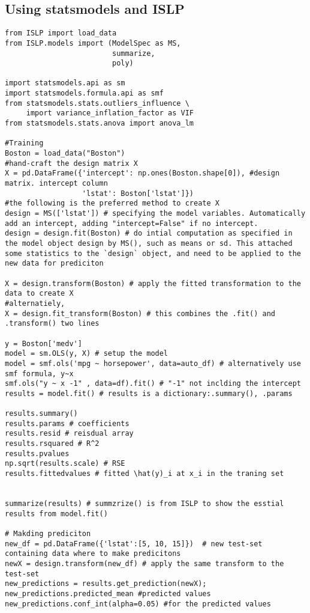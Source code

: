 \documentclass[
  letterpaper,
  DIV=11,
  numbers=noendperiod]{scrreprt}
\begin{document}
\subsection{Using statsmodels and
ISLP}\label{using-statsmodels-and-islp}

\begin{verbatim}
from ISLP import load_data
from ISLP.models import (ModelSpec as MS,
                         summarize,
                         poly)
                         
import statsmodels.api as sm
import statsmodels.formula.api as smf
from statsmodels.stats.outliers_influence \
     import variance_inflation_factor as VIF
from statsmodels.stats.anova import anova_lm

#Training
Boston = load_data("Boston") 
#hand-craft the design matrix X
X = pd.DataFrame({'intercept': np.ones(Boston.shape[0]), #design matrix. intercept column
                  'lstat': Boston['lstat']}) 
#the following is the preferred method to create X
design = MS(['lstat']) # specifying the model variables. Automatically add an intercept, adding "intercept=False" if no intercept. 
design = design.fit(Boston) # do intial computation as specified in the model object design by MS(), such as means or sd. This attached some statistics to the `design` object, and need to be applied to the new data for prediciton

X = design.transform(Boston) # apply the fitted transformation to the data to create X
#alternatiely, 
X = design.fit_transform(Boston) # this combines the .fit() and .transform() two lines

y = Boston['medv']
model = sm.OLS(y, X) # setup the model
model = smf.ols('mpg ~ horsepower', data=auto_df) # alternatively use smf formula, y~x
smf.ols("y ~ x -1" , data=df).fit() # "-1" not inclding the intercept
results = model.fit() # results is a dictionary:.summary(), .params 

results.summary()
results.params # coefficients
results.resid # reisdual array
results.rsquared # R^2
results.pvalues
np.sqrt(results.scale) # RSE
results.fittedvalues # fitted \hat(y)_i at x_i in the traning set


summarize(results) # summzrize() is from ISLP to show the esstial results from model.fit()

# Makding prediciton 
new_df = pd.DataFrame({'lstat':[5, 10, 15]})  # new test-set containing data where to make predicitons
newX = design.transform(new_df) # apply the same transform to the test-set
new_predictions = results.get_prediction(newX);
new_predictions.predicted_mean #predicted values
new_predictions.conf_int(alpha=0.05) #for the predicted values


\end{verbatim}
\end{document}
